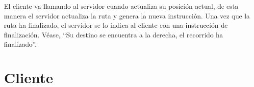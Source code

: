 
El cliente va llamando al servidor cuando actualiza su posición actual, de esta manera el servidor actualiza la ruta y genera la nueva instrucción. Una vez que la ruta ha finalizado, el servidor se lo indica al cliente con una instrucción de finalización. Véase, ``Su destino se encuentra a la derecha, el recorrido ha finalizado''.

\section{Cliente}